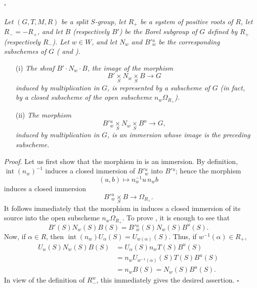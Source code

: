 \paragraph{.}
\textit{Let \((G,T,M,R)\) be a split \(S\)-group, let \(R_+\) be a
system of positive roots of \(R\), let \(R_-=-R_+\), and let \(B\)
\textup{(respectively \(B'\))} be the Borel subgroup of \(G\)
defined by \(R_+\) \textup{(respectively \(R_-\))}. Let \(w\in W\),
and let \(N_w\) and \(B'{}^u_w\) be the corresponding subschemes of
\(G\) \textup{( and )}.}
\begin{enumerate}
\item[\textup{\SGAInlineRefTarget{sga3:xxii:lem:5.7.3:item:i}(i)}]
\textit{The sheaf \(B'\cdot N_w\cdot B\), the image of the
morphism}
\[
  B'\mathop{\times}\limits_S N_w
  \mathop{\times}\limits_S B
  \longrightarrow G
\]
\textit{induced by multiplication in \(G\), is represented by a
subscheme of \(G\) \textup{(in fact, by a closed subscheme of the
open subscheme \(n_w\Omega_{R_+}\))}.}

\item[\textup{\SGAInlineRefTarget{sga3:xxii:lem:5.7.3:item:ii}(ii)}]
\textit{The morphism}
\[
  B'{}^u_w\mathop{\times}\limits_S N_w
  \mathop{\times}\limits_S B^u
  \longrightarrow G,
\]
\textit{induced by multiplication in \(G\), is an immersion whose
image is the preceding subscheme.}
\end{enumerate}

\textit{Proof.}
Let us first show that the morphism in \textup{} is an
immersion. By definition, \(\operatorname{int}(n_w)^{-1}\) induces
a closed immersion of \(B'{}^u_w\) into \(B'{}^u\); hence the
morphism
\[
  (u,b)\longmapsto n_w^{-1}u\,n_wb
\]
induces a closed immersion
\[
  B'{}^u_w\mathop{\times}\limits_S B
  \longrightarrow \Omega_{R_+}.
\]
It follows immediately that the morphism in \textup{} induces a
closed immersion of its source into the open subscheme
\(n_w\Omega_{R_+}\). To prove \textup{}, it is enough to see that
\[
  B'(S)N_w(S)B(S)
  =
  B'{}^u_w(S)N_w(S)B^u(S).
\]
Now, if \(\alpha\in R\), then
\(\operatorname{int}(n_w)U_\alpha(S)=U_{w(\alpha)}(S)\). Thus, if
\(w^{-1}(\alpha)\in R_+\),
\[
\begin{aligned}
  U_\alpha(S)N_w(S)B(S)
  &=U_\alpha(S)n_wT(S)B^u(S)\\
  &=n_wU_{w^{-1}(\alpha)}(S)T(S)B^u(S)\\
  &=n_wB(S)=N_w(S)B^u(S).
\end{aligned}
\]
In view of the definition of \(R_-^w\), this immediately gives the
desired assertion.
\hfill\(\square\)

